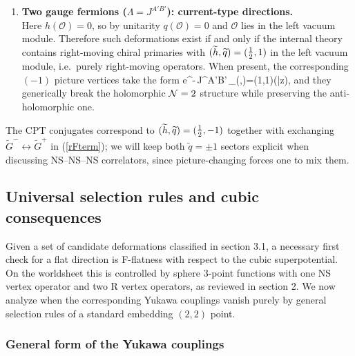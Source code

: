 \documentclass[12pt]{article}
\newcommand{\wt}[1]{\widetilde{#1}}
\newcommand{\mc}[1]{\mathcal{#1}}
\newcommand{\bz}{\bar{z}}
\begin{document}
\begin{enumerate}
\item {\bf Two gauge fermions ($\Lambda=J^{A'B'}$): current-type directions.}\\
Here $h(\mc{O})=0$, so by unitarity $q(\mc{O})=0$ and $\mc{O}$ lies in the left vacuum module. Therefore such deformations exist if and only if the internal theory contains right-moving chiral primaries with $(\wt h,\wt q)=({1\over 2},1)$ in the left vacuum module, i.e.\ purely right-moving operators. When present, the corresponding $(-1)$ picture vertices take the form
\ie\label{defcurrent}
e^{-{\wt\phi}}\,J^{A'B'}\,\mc{U}_{(\wt h,\wt q)=({1},1)}(\bz),
\fe
and they generically break the holomorphic ${\cal N}=2$ structure while preserving the anti-holomorphic one.
\end{enumerate}

The CPT conjugates correspond to $(\wt h,\wt q)=({1\over 2},-1)$ together with exchanging $\wt G^-\leftrightarrow \wt G^+$ in (\ref{rFterm}); we will keep both $\wt q=\pm 1$ sectors explicit when discussing NS--NS--NS correlators, since picture-changing forces one to mix them.

\subsection{Universal selection rules and cubic consequences}

Given a set of candidate deformations classified in section 3.1, a necessary first check for a flat direction is F-flatness with respect to the cubic superpotential. On the worldsheet this is controlled by sphere 3-point functions with one NS vertex operator and two R vertex operators, as reviewed in section 2. We now analyze when the corresponding Yukawa couplings vanish purely by general selection rules of a standard embedding $(2,2)$ point.

\subsubsection*{General form of the Yukawa couplings}
\end{document}
